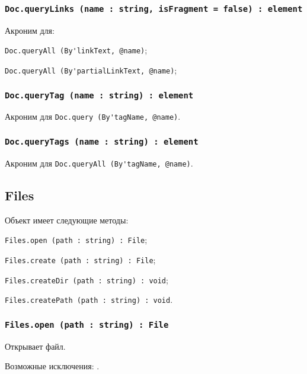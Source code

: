 \subsubsection{\lstinline|Doc.queryLinks (name : string, isFragment = false) : element|}

Акроним для:
\begin{icItems}
	\item \lstinline|Doc.queryAll (By'linkText, @name)|;
	\item \lstinline|Doc.queryAll (By'partialLinkText, @name)|;
\end{icItems}

\subsubsection{\lstinline|Doc.queryTag (name : string) : element|}

Акроним для \lstinline|Doc.query (By'tagName, @name)|.

\subsubsection{\lstinline|Doc.queryTags (name : string) : element|}

Акроним для \lstinline|Doc.queryAll (By'tagName, @name)|.

\subsection{{\color{orange} Files}}

Объект \files{} имеет следующие методы:
\begin{icItems}
	\item \lstinline|Files.open (path : string) : File|;
	\item \lstinline|Files.create (path : string) : File|;
	\item \lstinline|Files.createDir (path : string) : void|;
	\item \lstinline|Files.createPath (path : string) : void|.
\end{icItems}

\subsubsection{\lstinline|Files.open (path : string) : File|}

Открывает файл.

Возможные исключения: .

